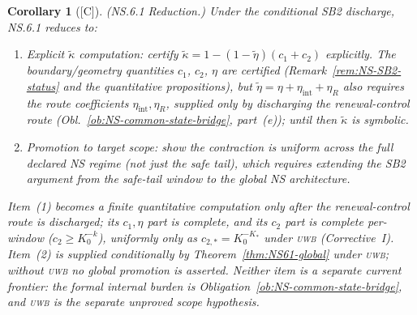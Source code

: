 \documentclass[12pt,oneside]{amsbook}
\theoremstyle{plain}
\newtheorem{corollary}[theorem]{Corollary}
\theoremstyle{definition}
\theoremstyle{remark}
\newcommand{\status}[1]{\textup{[#1]}}
\begin{document}
\begin{corollary}[\status{C}]\label{cor:NS61-almost}
\textup{(NS.6.1 Reduction.)}
Under the conditional SB2 discharge, NS.6.1 reduces to:
\begin{enumerate}[label=\textup{(\arabic*)}]
 \item \emph{Explicit $\widetilde\kappa$ computation}: certify
 $\widetilde\kappa = 1-(1-\widetilde\eta)(c_1+c_2)$ explicitly.
 The boundary/geometry quantities $c_1$, $c_2$, $\eta$ are
 certified (Remark~\ref{rem:NS-SB2-status} and the quantitative
 propositions), but
 $\widetilde\eta = \eta + \eta_{\mathrm{int}} + \eta_R$ also
 requires the route coefficients
 $\eta_{\mathrm{int}}, \eta_R$, supplied only by discharging
 the renewal-control route
 (Obl.~\ref{ob:NS-common-state-bridge}, part~(e)); until then
 $\widetilde\kappa$ is symbolic.
 \item \emph{Promotion to target scope}: show the contraction
 is uniform across the full declared NS regime (not just
 the safe tail), which requires extending the SB2 argument
 from the safe-tail window to the global NS architecture.
\end{enumerate}
Item~(1) becomes a finite quantitative computation \emph{only
after} the renewal-control route is discharged; its
$c_1, \eta$ part is complete, and its $c_2$ part is complete
per-window ($c_2 \geq K_0^{-k}$), uniformly only as
$c_{2,*} = K_0^{-K_*}$ under \textsc{uwb} (Corrective~I).
Item~(2) is supplied conditionally by
Theorem~\ref{thm:NS61-global} under \textsc{uwb}; without \textsc{uwb}
no global promotion is asserted. Neither item is a separate current
frontier: the formal internal burden is
Obligation~\ref{ob:NS-common-state-bridge}, and \textsc{uwb} is the
separate unproved scope hypothesis.
\end{corollary}
\end{document}
